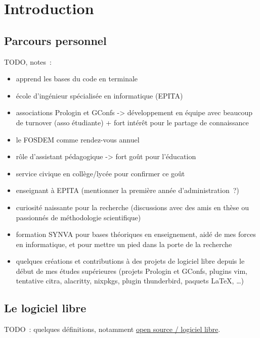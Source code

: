 \chapter{Introduction}

\section{Parcours personnel}

TODO, notes :

\begin{itemize}
    \item apprend les bases du code en terminale
    \item école d'ingénieur spécialisée en informatique (EPITA)
    \item associations Prologin et GConfs -> développement en équipe avec beaucoup de turnover (asso
        étudiante) + fort intérêt pour le partage de connaissance
    \item le FOSDEM comme rendez-vous annuel
    \item rôle d'assistant pédagogique -> fort goût pour l'éducation
    \item service civique en collège/lycée pour confirmer ce goût
    \item enseignant à EPITA (mentionner la première année d'administration ?)
    \item curiosité naissante pour la recherche (discussions avec des amis en thèse ou passionnés de
        méthodologie scientifique)
    \item formation SYNVA pour bases théoriques en enseignement, aidé de mes forces en informatique, et pour
        mettre un pied dans la porte de la recherche
    \item quelques créations et contributions à des projets de logiciel libre depuis le début de mes études
        supérieures (projets Prologin et GConfs, plugins vim, tentative citra, alacritty, nixpkgs, plugin
        thunderbird, paquets \LaTeX, \ldots)
\end{itemize}

\section{Le logiciel libre}

TODO : quelques définitions, notamment \href{https://opensource.org/osd}{open source / logiciel libre}.
